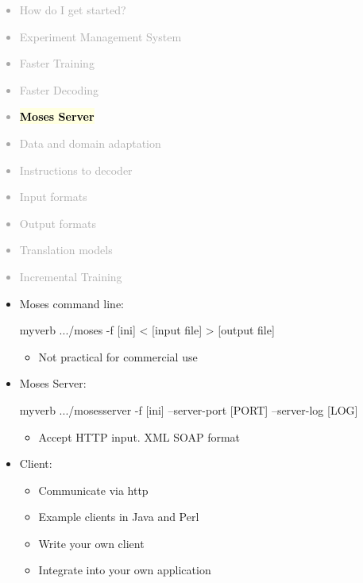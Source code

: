 \documentclass[landscape]{uedslides2C}
\newcommand{\currenttopic}[1]{\colorbox{lightyellow}{\textcolor{black}{\bf #1}}}
\begin{document}

\vspace{-5mm}
\textcolor{darkgrey}{
\begin{itemize} \itemsep -1mm
\item {How do I get started?}
\item {Experiment Management System}
\item {Faster Training}
\item {Faster Decoding}
\item \currenttopic{Moses Server}
\item {Data and domain adaptation}
\item {Instructions to decoder}
\item {Input formats}
\item {Output formats}
\item {Translation models}
\item {Incremental Training}
\end{itemize}
}


\begin{itemize} \itemsep -1mm
\item Moses command line:\\[3mm]
\begin{SaveVerbatim}{myverb} 
  .../moses -f [ini] < [input file] > [output file]
\end{SaveVerbatim}
\colorbox{gray}{}
    \begin{itemize}
      \item Not practical for commercial use
    \end{itemize}


\item Moses Server:\\[3mm]
    \begin{SaveVerbatim}{myverb} 
 .../mosesserver -f [ini] --server-port [PORT] --server-log [LOG]
    \end{SaveVerbatim}
    \colorbox{gray}{}
    \begin{itemize}
      \item Accept HTTP input. XML SOAP format
    \end{itemize}

\item Client:
    \begin{itemize}
      \item Communicate via http
      \item Example clients in Java and Perl
      \item Write your own client
      \item Integrate into your own application
    \end{itemize}
    
\end{itemize}
\end{document}
